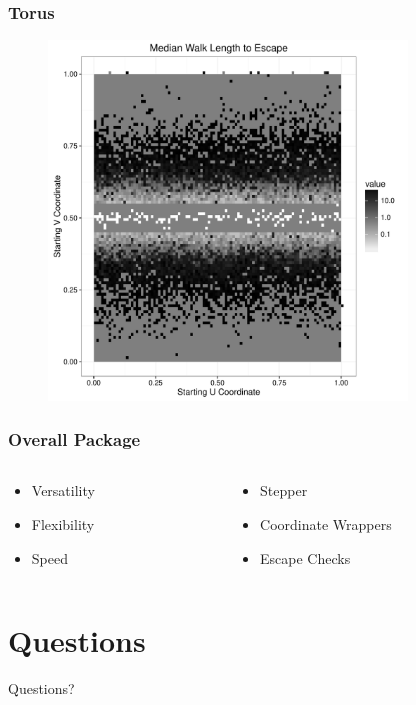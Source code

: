 \documentclass{beamer}
\begin{document}
\begin{frame}
	
	\frametitle{Torus}
	
	\begin{figure}
		\includegraphics[width=0.85\textwidth]{images/TorusVBand.pdf}
	\end{figure}
	
\end{frame}


\begin{frame}
	
	\frametitle{Overall Package}
	
	\begin{columns}
		\begin{column}{0.5\textwidth}
			\begin{itemize}
				\item Versatility
				\item Flexibility
				\item Speed
			\end{itemize}
		\end{column}
		
		\begin{column}{0.5\textwidth}
			\begin{itemize}
				\item Stepper
				\item Coordinate Wrappers
				\item Escape Checks
			\end{itemize}
		\end{column}
	\end{columns}
	
	
\end{frame}

\section{Questions}

\begin{frame}
\Huge{\centerline{Questions?}}
\end{frame}
\end{document}
